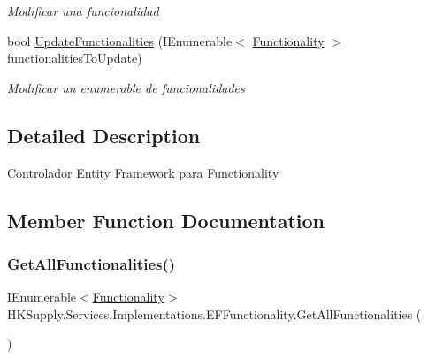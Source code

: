 \begin{DoxyCompactItemize}
\begin{DoxyCompactList}\small\item\em Modificar una funcionalidad \end{DoxyCompactList}\item 
bool \hyperlink{class_h_k_supply_1_1_services_1_1_implementations_1_1_e_f_functionality_a2093874e195260c8963796b45aeba022}{Update\+Functionalities} (I\+Enumerable$<$ \hyperlink{class_h_k_supply_1_1_models_1_1_functionality}{Functionality} $>$ functionalities\+To\+Update)
\begin{DoxyCompactList}\small\item\em Modificar un enumerable de funcionalidades \end{DoxyCompactList}\end{DoxyCompactItemize}


\subsection{Detailed Description}
Controlador Entity Framework para Functionality 



\subsection{Member Function Documentation}
\mbox{\label{class_h_k_supply_1_1_services_1_1_implementations_1_1_e_f_functionality_ab92f666d01076cffafbddbb91c5cf6af}} 
\subsubsection{\texorpdfstring{Get\+All\+Functionalities()}{GetAllFunctionalities()}}
{\footnotesize\ttfamily I\+Enumerable$<$\hyperlink{class_h_k_supply_1_1_models_1_1_functionality}{Functionality}$>$ H\+K\+Supply.\+Services.\+Implementations.\+E\+F\+Functionality.\+Get\+All\+Functionalities (\begin{DoxyParamCaption}{ }\end{DoxyParamCaption})}



